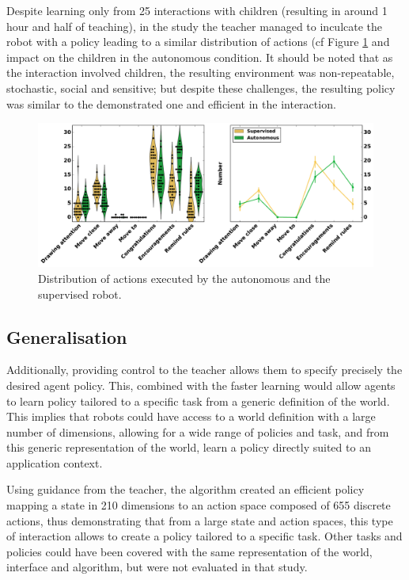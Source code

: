 \documentclass[letterpaper, 10 pt, conference]{ieeeconf}  %
\begin{document}
Despite learning only from 25 interactions with children (resulting in around 1 hour and half of teaching), in the study the teacher managed to inculcate the robot with a policy leading to a similar distribution of actions (cf Figure \ref{fig:actions} and impact on the children in the autonomous condition. It should be noted that as the interaction involved children, the resulting environment was non-repeatable, stochastic, social and sensitive; but despite these challenges, the resulting policy was similar to the demonstrated one and efficient in the interaction.

\begin{figure}[ht]
	\includegraphics[width=1\linewidth]{actions.pdf}
	\centering
	\caption{Distribution of actions executed by the autonomous and the supervised robot.}
	\label{fig:actions}
\end{figure}

\subsection{Generalisation}
Additionally, providing control to the teacher allows them to specify precisely the desired agent policy. This, combined with the faster learning would allow agents to learn policy tailored to a specific task from a generic definition of the world. This implies that robots could have access to a world definition with a large number of dimensions, allowing for a wide range of policies and task, and from this generic representation of the world, learn a policy directly suited to an application context.

Using guidance from the teacher, the algorithm created an efficient policy mapping a state in 210 dimensions to an action space composed of 655 discrete actions, thus demonstrating that from a large state and action spaces, this type of interaction allows to create a policy tailored to a specific task. Other tasks and policies could have been covered with the same representation of the world, interface and algorithm, but were not evaluated in that study.
\end{document}
